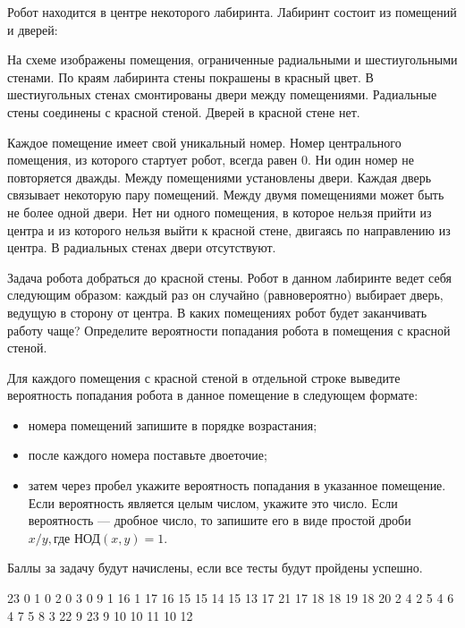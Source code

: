 
Робот находится в центре некоторого лабиринта. Лабиринт состоит из помещений и дверей:


На схеме изображены помещения, ограниченные радиальными и шестиугольными стенами. По краям лабиринта стены покрашены в красный цвет. В шестиугольных стенах смонтированы двери между помещениями. Радиальные стены соединены с красной стеной. Дверей в красной стене нет.

Каждое помещение имеет свой уникальный номер. Номер центрального помещения, из которого стартует робот, всегда равен 0. Ни один номер не повторяется дважды. Между помещениями установлены двери. Каждая дверь связывает некоторую пару помещений. Между двумя помещениями может быть не более одной двери. Нет ни одного помещения, в которое нельзя прийти из центра и из которого нельзя выйти к красной стене, двигаясь по направлению из центра. В радиальных стенах двери отсутствуют.

Задача робота добраться до красной стены. Робот в данном лабиринте ведет себя следующим образом: каждый раз он случайно (равновероятно) выбирает дверь, ведущую в сторону от центра. В каких помещениях робот будет заканчивать работу чаще? Определите вероятности попадания робота в помещения с красной стеной.

Для каждого помещения с красной стеной в отдельной строке выведите вероятность попадания робота в данное помещение в следующем формате:

\begin{itemize}
    \item номера помещений запишите в порядке возрастания;
    \item после каждого номера поставьте двоеточие;
    \item затем через пробел укажите вероятность попадания в указанное помещение. Если вероятность является целым числом, 
    укажите это число. Если вероятность — дробное число, то запишите его в виде простой дроби $x/y, \text{где НОД}(x,y)=1$.
\end{itemize}

\markSection

Баллы за задачу будут начислены, если все тесты будут пройдены успешно.


\begin{myverbbox}[\small]{\vinput}
    23
    0 1
    0 2
    0 3
    0 9
    1 16
    1 17
    16 15
    15 14
    15 13
    17 21
    17 18
    18 19
    18 20
    2 4
    2 5
    4 6
    4 7
    5 8
    3 22
    9 23
    9 10
    10 11
    10 12
\end{myverbbox}

